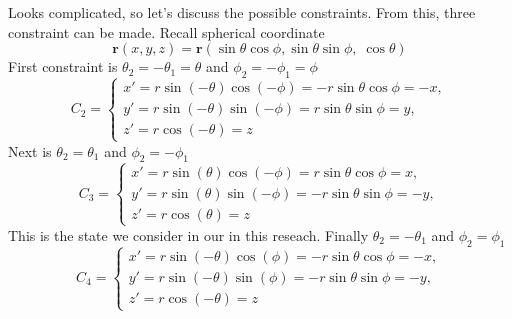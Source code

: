 \documentclass[../../../main.tex]{subfiles}
\begin{document}
Looks complicated, so let's discuss the possible constraints.
From this, three constraint can be made.
Recall spherical coordinate
\begin{equation*}
  \mathbf r(x,y,z)
  =
  \mathbf r(\sin\theta\cos\phi,
  \sin\theta\sin\phi,\;
  \cos\theta)
\end{equation*}
First constraint is $\theta_2=-\theta_1=\theta$ and $ \phi_2=-\phi_1=\phi$
\begin{equation*}
  C_2=\begin{cases}
    x'
    =r\sin(-\theta)\cos(-\phi)
    =-r\sin\theta\cos\phi=-x, \\
    y'
    =r\sin(-\theta)\sin(-\phi)
    =r\sin\theta\sin\phi=y,   \\
    z'
    =r\cos(-\theta)=z
  \end{cases}
\end{equation*}
Next is $\theta_2=\theta_1$ and $ \phi_2=-\phi_1$
\begin{equation*}
  C_3=\begin{cases}
    x'
    =r\sin(\theta)\cos(-\phi)
    =r\sin\theta\cos\phi=x,   \\
    y'
    =r\sin(\theta)\sin(-\phi)
    =-r\sin\theta\sin\phi=-y, \\
    z'
    =r\cos(\theta)=z
  \end{cases}
\end{equation*}
This is the state we consider in our in this reseach.
Finally $\theta_2=-\theta_1$ and $ \phi_2=\phi_1$
\begin{equation*}
  C_4=\begin{cases}
    x'
    =r\sin(-\theta)\cos(\phi)
    =-r\sin\theta\cos\phi=-x, \\
    y'
    =r\sin(-\theta)\sin(\phi)
    =-r\sin\theta\sin\phi=-y, \\
    z'
    =r\cos(-\theta)=z
  \end{cases}
\end{equation*}
\end{document}
